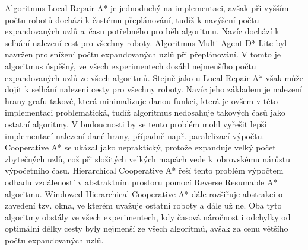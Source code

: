 Algoritmus Local Repair A* je jednoduchý na implementaci, avšak při vyšším počtu robotů dochází k častému přeplánování, tudíž k navýšení počtu expandovaných uzlů a~času potřebného pro běh algoritmu. Navíc dochází k selhání nalezení cest pro všechny roboty. Algoritmus Multi Agent D* Lite byl navržen pro snížení počtu expandovaných uzlů při přeplánování. V tomto je algoritmus úspěšný, ve všech experimentech dosáhl nejmenšího počtu expandovaných uzlů ze všech algoritmů. Stejně jako u Local Repair A* však může dojít k selhání nalezení cesty pro všechny roboty. Navíc jeho základem je nalezení hrany grafu takové, která minimalizuje danou funkci, která je ovšem v této implementaci problematická, tudíž algoritmus nedosahuje takových časů jako ostatní algoritmy. V budoucnosti by se tento problém mohl vyřešit lepší implementací nalezení dané hrany, případně např. paralelizací výpočtu. Cooperative A* se ukázal jako nepraktický, protože expanduje velký počet zbytečných uzlů, což při složitých velkých mapách vede k~obrovskému nárůstu výpočetního času. Hierarchical Cooperative A* řeší tento problém výpočtem odhadu vzdáleností v abstraktním prostoru pomocí Reverse Resumable A* algoritmu. Windowed Hierarchical Cooperative A* dále rozšiřuje abstrakci o zavedení tzv. okna, ve kterém uvažuje ostatní roboty a dále už ne. Oba tyto algoritmy obstály ve všech experimentech, kdy časová náročnost i odchylky od optimální délky cesty byly nejmenší ze všech algoritmů, avšak za cenu většího počtu expandovaných uzlů.



